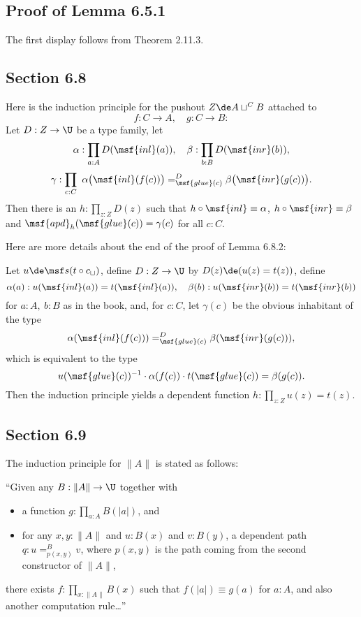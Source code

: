 \documentclass[12pt]{article}
\begin{document}

\subsection{Proof of Lemma 6.5.1}

The first display follows from Theorem 2.11.3.


\subsection{Section 6.8}

Here is the induction principle for the pushout $Z\de A\sqcup^CB$ attached to 
$$
f:C\to A,\quad g:C\to B:
$$ 
Let $D:Z\to\U$ be a type family, let 
$$
\alpha:\prod_{a:A}D(\msf{inl}(a)),\quad\beta:\prod_{b:B}D(\msf{inr}(b)),
$$
$$
\gamma:\prod_{c:C}\ \alpha\big(\msf{inl}(f(c))\big)=^D_{\msf{glue}(c)}\beta\big(\msf{inr}(g(c))\big).
$$ 
Then there is an $h:\prod_{z:Z}D(z)$ such that $h\circ \msf{inl}\equiv\alpha$, $h\circ \msf{inr}\equiv\beta$ and $\msf{apd}_h(\msf{glue}(c))=\gamma(c)$ for all $c:C$. 

Here are more details about the end of the proof of Lemma 6.8.2:

Let $u\de\msf s(t\circ c_\sqcup)$, define $D:Z\to\U$ by $D(z)\de(u(z)=t(z))$, define 
$$
\alpha(a):u(\msf{inl}(a))=t(\msf{inl}(a)),\quad\beta(b):u(\msf{inr}(b))=t(\msf{inr}(b))
$$ 
for $a:A,\ b:B$ as in the book, and, for $c:C$, let $\gamma(c)$ be the obvious inhabitant of the type
$$
\alpha(\msf{inl}(f(c)))=^D_{\msf{glue}(c)}\beta(\msf{inr}(g(c))),
$$ 
which is equivalent to the type 
$$ 
u(\msf{glue}(c))^{-1}\cdot\alpha(f(c))\cdot t(\msf{glue}(c))=\beta(g(c)).
$$ 
Then the induction principle yields a dependent function $h:\prod_{z:Z}u(z)=t(z)$.


\subsection{Section 6.9}

The induction principle for $\lVert A\rVert$ is stated as follows:

\nn``Given any $B:\lVert A\rVert\to\U$ together with
\begin{itemize}
\item a function $g:\prod_{a:A}B(\lvert a\rvert)$, and
\item for any $x,y:\lVert A\rVert$ and $u:B(x)$ and $v:B(y)$, a dependent path $q:u=^B_{p(x,y)}v$, where $p(x,y)$ is the path coming from the second constructor of $\lVert A\rVert$,
\end{itemize}
there exists $f:\prod_{x:\lVert A\rVert}B(x)$ such that $f(\lvert a\rvert)\equiv g(a)$ for $a:A$, and also another computation rule\dots''
\end{document}
